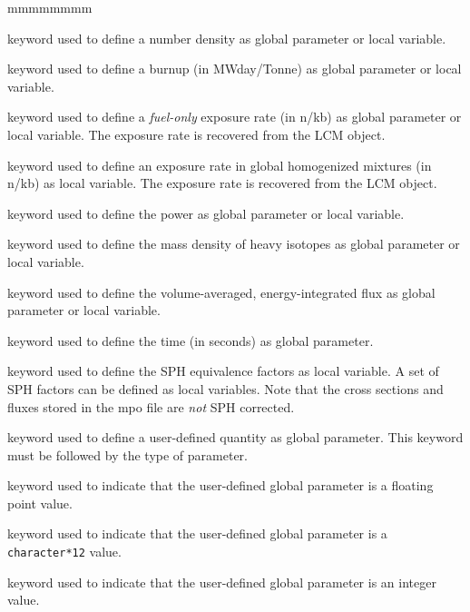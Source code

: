 \begin{ListeDeDescription}{mmmmmmmm}
\item[\moc{CONC}] keyword used to define a number density as global parameter or
local variable.

\item[\moc{IRRA}] keyword used to define a burnup (in MWday/Tonne) as global
parameter or local variable.

\item[\moc{FLUB}] keyword used to define a {\sl fuel-only} exposure rate (in n/kb) as global
parameter or local variable. The exposure rate is recovered from the 
LCM object.

\item[\moc{FLUG}] keyword used to define an exposure rate in global homogenized mixtures (in n/kb) as
local variable. The exposure rate is recovered from the 
LCM object.

\item[\moc{PUIS}] keyword used to define the power as global parameter or
local variable.

\item[\moc{MASL}] keyword used to define the mass density of heavy isotopes as
global parameter or local variable.

\item[\moc{FLUX}] keyword used to define the volume-averaged, energy-integrated flux as
global parameter or local variable.

\item[\moc{TIME}] keyword used to define the time (in seconds) as global parameter.

\item[\moc{EQUI}] keyword used to define the SPH equivalence factors as
local variable. A set of SPH factors can be defined as local
variables. Note that the cross sections and fluxes stored in the {\sc mpo} file are
{\sl not} SPH corrected.

\item[\moc{VALU}] keyword used to define a user-defined quantity as global parameter.
This keyword must be followed by the type of parameter.

\item[\moc{REAL}] keyword used to indicate that the user-defined global parameter
is a floating point value.

\item[\moc{CHAR}] keyword used to indicate that the user-defined global parameter
is a {\tt character*12} value.

\item[\moc{INTE}] keyword used to indicate that the user-defined global parameter
is an integer value.


\end{ListeDeDescription}
